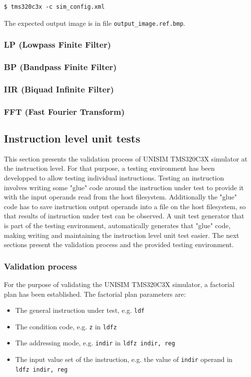 \begin{verbatim}
$ tms320c3x -c sim_config.xml
\end{verbatim}

The expected output image is in file \texttt{output\_image.ref.bmp}.

\subsubsection{LP (Lowpass Finite Filter)}

\subsubsection{BP (Bandpass Finite Filter)}

\subsubsection{IIR (Biquad Infinite Filter)}

\subsubsection{FFT (Fast Fourier Transform)}

\subsection{Instruction level unit tests}

This section presents the validation process of UNISIM TMS320C3X simulator at the instruction level.
For that purpose, a testing environment has been developped to allow testing individual instructions.
Testing an instruction involves writing some "glue" code around the instruction under test to provide it with the input operands read from the host filesystem.
Additionally the "glue" code has to save instruction output operands into a file on the host filesystem, so that results of instruction under test can be observed.
A unit test generator that is part of the testing environment, automatically generates that "glue" code, making writing and maintaining the instruction level unit test easier.
The next sections present the validation process and the provided testing environment.

\subsubsection{Validation process}

For the purpose of validating the UNISIM TMS320C3X simulator, a factorial plan has been established. The factorial plan parameters are:
\begin{itemize}
\item The general instruction under test, e.g. \texttt{ldf}
\item The condition code, e.g. \texttt{z} in \texttt{ldfz}
\item The addressing mode, e.g. \texttt{indir} in \texttt{ldfz indir, reg}
\item The input value set of the instruction, e.g. the value of \texttt{indir} operand in \texttt{ldfz indir, reg}
\end{itemize}

